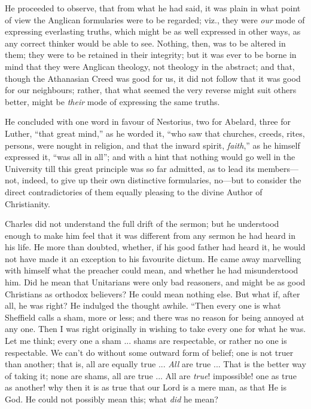 He proceeded to observe, that from what he had said, it was plain
in what point of view the Anglican formularies were to be regarded;
viz., they were \emph{our} mode of expressing everlasting truths,
which might be as well expressed in other ways, as any correct thinker
would be able to see. Nothing, then, was to be altered in them; they
were to be retained in their integrity; but it was ever to be borne in
mind that they were Anglican theology, not theology in the abstract;
and that, though the Athanasian Creed was good for us, it did not
follow that it was good for our neighbours; rather, that what seemed
the very reverse might suit others better, might be \emph{their} mode of
expressing the same truths.

He concluded with one word in favour of Nestorius, two for Abelard,
three for Luther, ``that great mind,'' as he worded it,
``who saw that churches, creeds, rites, persons, were nought in
religion, and that the inward spirit, \emph{faith},'' as he
himself expressed it, ``was all in all''; and with a hint
that nothing would go well in the University till this great principle
was so far admitted, as to lead its members—not, indeed, to give up
their own distinctive formularies, no—but to consider the direct
contradictories of them equally pleasing to the divine Author of
Christianity.

Charles did not understand the full drift of the sermon; but he
understood enough to make him feel that it was different from any
sermon he had heard in his life. He more than doubted, whether, if his
good father had heard it, he would not have made it an exception to
his favourite dictum. He came away marvelling with himself what the
preacher could mean, and whether he had misunderstood him. Did he mean
that Unitarians were only bad reasoners, and might be as good
Christians as orthodox believers? He could mean nothing else. But what
if, after all, he was right? He indulged the thought awhile.
``Then every one is what Sheffield calls a sham, more or less; and
there was no reason for being annoyed at any one. Then I was right
originally in wishing to take every one for what he was. Let me think;
every one a sham ... shams are respectable, or rather no one is
respectable. We can't do without some outward form of belief; one is
not truer than another; that is, all are equally true ... \emph{All}
are true ... That is the better way of taking it; none are shams, all
are true ... All are \emph{true}! impossible! one as true as another!
why then it is as true that our Lord is a mere man, as that He is God.
He could not possibly mean this; what \emph{did} he mean?

